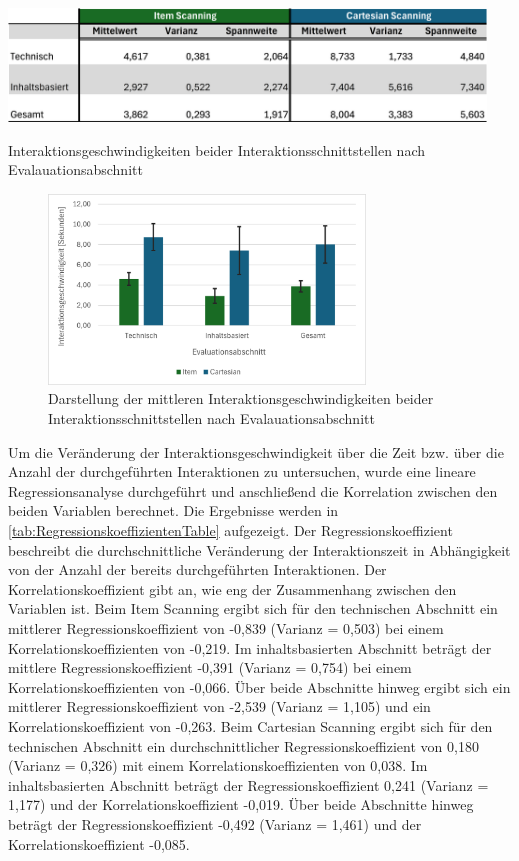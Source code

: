\begin{table}[tbh]
    \centering
    \includegraphics[width=0.95\textwidth]{images/Results/Interaktionsgeschwindigkeiten-Table.png}
    \caption{Interaktionsgeschwindigkeiten beider Interaktionsschnittstellen nach Evalauationsabschnitt}
    \label{tab:InteraktionsgeschwindigkeitenTable}
\end{table}

\begin{figure}[tbh]
    \centering
    \includegraphics[width=0.75\textwidth]{images/Results/Interaktionsgeschwindigkeiten.png}
    \caption{Darstellung der mittleren Interaktionsgeschwindigkeiten beider Interaktionsschnittstellen nach Evalauationsabschnitt}
    \label{fig:Interaktionsgeschwindigkeiten}
\end{figure}

Um die Veränderung der Interaktionsgeschwindigkeit über die Zeit bzw. über die Anzahl der durchgeführten Interaktionen zu untersuchen, wurde eine lineare Regressionsanalyse durchgeführt und anschließend die Korrelation zwischen den beiden Variablen berechnet. Die Ergebnisse werden in \autoref{tab:RegressionskoeffizientenTable} aufgezeigt. Der Regressionskoeffizient beschreibt die durchschnittliche Veränderung der Interaktionszeit in Abhängigkeit von der Anzahl der bereits durchgeführten Interaktionen. Der Korrelationskoeffizient gibt an, wie eng der Zusammenhang zwischen den Variablen ist. 
Beim Item Scanning ergibt sich für den technischen Abschnitt ein mittlerer Regressionskoeffizient von -0,839 (Varianz = 0,503) bei einem Korrelationskoeffizienten von -0,219. Im inhaltsbasierten Abschnitt beträgt der mittlere Regressionskoeffizient -0,391 (Varianz = 0,754) bei einem Korrelationskoeffizienten von -0,066. Über beide Abschnitte hinweg ergibt sich ein mittlerer Regressionskoeffizient von -2,539 (Varianz = 1,105) und ein Korrelationskoeffizient von -0,263.
Beim Cartesian Scanning ergibt sich für den technischen Abschnitt ein durchschnittlicher Regressionskoeffizient von 0,180 (Varianz = 0,326) mit einem Korrelationskoeffizienten von 0,038. Im inhaltsbasierten Abschnitt beträgt der Regressionskoeffizient 0,241 (Varianz = 1,177) und der Korrelationskoeffizient -0,019. Über beide Abschnitte hinweg beträgt der Regressionskoeffizient -0,492 (Varianz = 1,461) und der Korrelationskoeffizient -0,085.

